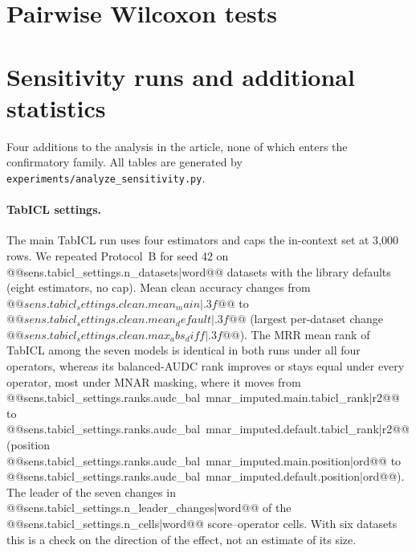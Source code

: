 \documentclass[pdflatex,sn-mathphys]{sn-jnl}
\theoremstyle{thmstyleone}
\begin{document}
\clearpage
\section{Pairwise Wilcoxon tests}\label{sup:wilcoxon}


\clearpage
\section{Sensitivity runs and additional statistics}\label{sup:sens}
Four additions to the analysis in the article, none of which enters the confirmatory family. All tables are generated by \texttt{experiments/analyze\_sensitivity.py}.

\paragraph{TabICL settings.} The main TabICL run uses four estimators and caps the in-context set at 3{,}000 rows. We repeated Protocol~B for seed 42 on @@{sens.tabicl_settings.n_datasets|word}@@ datasets with the library defaults (eight estimators, no cap). Mean clean accuracy changes from $@@{sens.tabicl_settings.clean.mean_main|.3f}@@$ to $@@{sens.tabicl_settings.clean.mean_default|.3f}@@$ (largest per-dataset change $@@{sens.tabicl_settings.clean.max_abs_diff|.3f}@@$). The MRR mean rank of TabICL among the seven models is identical in both runs under all four operators, whereas its balanced-AUDC rank improves or stays equal under every operator, most under MNAR masking, where it moves from @@{sens.tabicl_settings.ranks.audc_bal~mnar_imputed.main.tabicl_rank|r2}@@ to @@{sens.tabicl_settings.ranks.audc_bal~mnar_imputed.default.tabicl_rank|r2}@@ (position @@{sens.tabicl_settings.ranks.audc_bal~mnar_imputed.main.position|ord}@@ to @@{sens.tabicl_settings.ranks.audc_bal~mnar_imputed.default.position|ord}@@). The leader of the seven changes in @@{sens.tabicl_settings.n_leader_changes|word}@@ of the @@{sens.tabicl_settings.n_cells|word}@@ score--operator cells. With six datasets this is a check on the direction of the effect, not an estimate of its size.
\end{document}
